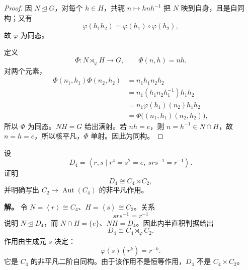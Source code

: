 \begin{proof}
因 $N\mathrel{\trianglelefteq} G$，对每个 $h\in H$，共轭 $n\mapsto hnh^{-1}$ 把 $N$ 映到自身，且是自同构；又有
\[
\varphi(h_1h_2)=\varphi(h_1)\circ\varphi(h_2),
\]
故 $\varphi$ 为同态。

定义
\[
\Phi:N\rtimes_{\varphi}H\to G,
\qquad
\Phi(n,h)=nh.
\]
对两个元素，
\begin{align*}
\Phi(n_1,h_1)\Phi(n_2,h_2)
&=n_1h_1n_2h_2\\
&=n_1(h_1n_2h_1^{-1})h_1h_2\\
&=n_1\varphi(h_1)(n_2)h_1h_2\\
&=\Phi\bigl((n_1,h_1)(n_2,h_2)\bigr),
\end{align*}
所以 $\Phi$ 为同态。$NH=G$ 给出满射。若 $nh=e$，则 $n=h^{-1}\in N\cap H$，故 $n=h=e$，所以核平凡，$\Phi$ 单射。因此为同构。
\end{proof}

\begin{workedexample}[$D_4$ 的半直积结构]
设
\[
D_4=\left\langle r,s\mid r^4=s^2=e,\ srs^{-1}=r^{-1}\right\rangle.
\]
证明
\[
D_4\cong C_4\rtimes C_2,
\]
并明确写出 $C_2\to\operatorname{Aut}(C_4)$ 的非平凡作用。

\textbf{解。} 令 $N=\left\langle r\right\rangle\cong C_4$、$H=\left\langle s\right\rangle\cong C_2$。关系
\[
srs^{-1}=r^{-1}
\]
说明 $N\mathrel{\trianglelefteq} D_4$，而 $N\cap H=\{e\}$、$NH=D_4$。因此内半直积判据给出
\[
D_4\cong C_4\rtimes_\varphi C_2.
\]
作用由生成元 $s$ 决定：
\[
\varphi(s)(r^k)=r^{-k}.
\]
它是 $C_4$ 的非平凡二阶自同构。由于该作用不是恒等作用，$D_4$ 不是 $C_4\times C_2$。
\end{workedexample}

